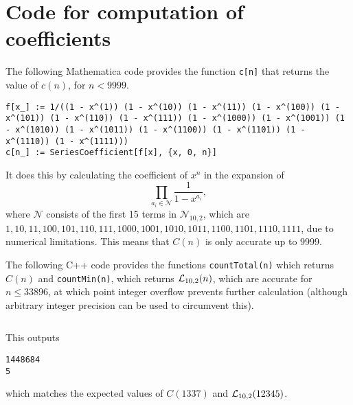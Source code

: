 \clearpage
\appendix
\section{Code for computation of coefficients}
The following Mathematica code provides the function \verb|c[n]| that returns the value of $c(n)$, for $n<9999$.
\begin{verbatim}
f[x_] := 1/((1 - x^(1)) (1 - x^(10)) (1 - x^(11)) (1 - x^(100)) (1 - x^(101)) (1 - x^(110)) (1 - x^(111)) (1 - x^(1000)) (1 - x^(1001)) (1 - x^(1010)) (1 - x^(1011)) (1 - x^(1100)) (1 - x^(1101)) (1 - x^(1110)) (1 - x^(1111)))
c[n_] := SeriesCoefficient[f[x], {x, 0, n}]
\end{verbatim}
It does this by calculating the coefficient of $x^{n}$ in the expansion of \[
  \prod_{a_{i}\in \mathcal{N}}\frac{1}{1-x^{a_i}}
,\] where $\mathcal{N}$ consists of the first 15 terms in $\mathcal{N}_{10, 2}$, which are $1, 10, 11, 100, 101, 110, 111, \allowbreak 1000, \allowbreak 1001, \allowbreak 1010, \allowbreak 1011, \allowbreak 1100, 1101, 1110, 1111$, due to numerical limitations. This means that $C(n)$ is only accurate up to $9999$.

The following C++ code provides the functions \verb|countTotal(n)| which returns $C(n)$ and \verb|countMin(n)|, which returns  $\mathcal{L}_{10, 2}(n)$, which are accurate for $n \le 33896$, at which point integer overflow prevents further calculation (although arbitrary integer precision can be used to circumvent this).
\inputminted{cpp}{code/code.cpp}
This outputs
\begin{verbatim}
1448684
5
\end{verbatim}
which matches the expected values of $C(1337)$ and $\mathcal{L}_{10, 2}(12345)$.
